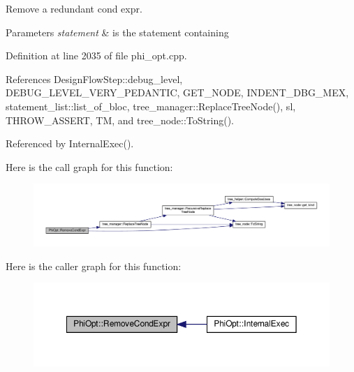Remove a redundant cond expr. 


\begin{DoxyParams}{Parameters}
{\em statement} & is the statement containing \\
\hline
\end{DoxyParams}


Definition at line 2035 of file phi\+\_\+opt.\+cpp.



References Design\+Flow\+Step\+::debug\+\_\+level, D\+E\+B\+U\+G\+\_\+\+L\+E\+V\+E\+L\+\_\+\+V\+E\+R\+Y\+\_\+\+P\+E\+D\+A\+N\+T\+IC, G\+E\+T\+\_\+\+N\+O\+DE, I\+N\+D\+E\+N\+T\+\_\+\+D\+B\+G\+\_\+\+M\+EX, statement\+\_\+list\+::list\+\_\+of\+\_\+bloc, tree\+\_\+manager\+::\+Replace\+Tree\+Node(), sl, T\+H\+R\+O\+W\+\_\+\+A\+S\+S\+E\+RT, TM, and tree\+\_\+node\+::\+To\+String().



Referenced by Internal\+Exec().

Here is the call graph for this function\+:
\nopagebreak
\begin{figure}[H]
\begin{center}
\leavevmode
\includegraphics[width=350pt]{dc/ddf/classPhiOpt_adf758836dc1fb94b9dacdb0c44e04b8c_cgraph}
\end{center}
\end{figure}
Here is the caller graph for this function\+:
\nopagebreak
\begin{figure}[H]
\begin{center}
\leavevmode
\includegraphics[width=350pt]{dc/ddf/classPhiOpt_adf758836dc1fb94b9dacdb0c44e04b8c_icgraph}
\end{center}
\end{figure}
\mbox{\label{classPhiOpt_a1914c66ecf01c9ae565631219c6a60ca}} 
